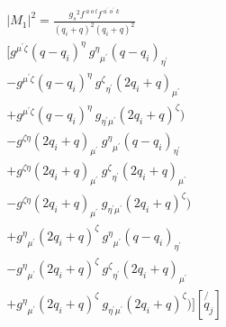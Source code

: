 \begin{equation}
\begin{split}
|M_1|^2=\frac{{g_s}^2 f^{\:a\:o\:l} f^{\:a^{\prime}\:o^{\prime}\:k}}{(q_i +q)^2 (q_i +q)^2}\\
[g^{{{\mu}^{\prime}}{\zeta}}(q-q_i)^{\eta}\:{g^{\eta}}_{{\mu}^{\prime}}(q-q_i)_{{\eta}^{\prime}}\\
-g^{{{\mu}^{\prime}}{\zeta}}(q-q_i)^{\eta}\:{g^{\zeta}}_{{\eta}^{\prime}}(2q_i +q)_{{\mu}^{\prime}}\\
+g^{{{\mu}^{\prime}}{\zeta}}(q-q_i)^{\eta}\:g_{{{\eta}^{\prime}}{{\mu}^{\prime}}}(2q_i +q)^{\zeta})\\
-g^{{\zeta}{\eta}}(2q_i +q)_{{\mu}^{\prime}}\:{g^{\eta}}_{{\mu}^{\prime}}(q-q_i)_{{\eta}^{\prime}}\\
+g^{{\zeta}{\eta}}(2q_i +q)_{{\mu}^{\prime}}\:{g^{\zeta}}_{{\eta}^{\prime}}(2q_i +q)_{{\mu}^{\prime}}\\
-g^{{\zeta}{\eta}}(2q_i +q)_{{\mu}^{\prime}}\:g_{{{\eta}^{\prime}}{{\mu}^{\prime}}}(2q_i +q)^{\zeta})\\
+{g^{\eta}}_{{\mu}^{\prime}}(2q_i +q)^{\zeta}\:{g^{\eta}}_{{\mu}^{\prime}}(q-q_i)_{{\eta}^{\prime}}\\
-{g^{\eta}}_{{\mu}^{\prime}}(2q_i +q)^{\zeta}\:{g^{\zeta}}_{{\eta}^{\prime}}(2q_i +q)_{{\mu}^{\prime}}\\+{g^{\eta}}_{{\mu}^{\prime}}(2q_i +q)^{\zeta}\:g_{{{\eta}^{\prime}}{{\mu}^{\prime}}}(2q_i +q)^{\zeta})][\not{q_j}]
\end{split}
\end{equation}









\pagebreak

